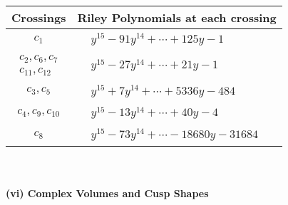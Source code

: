 \documentclass[1p]{elsarticle_modified}
\theoremstyle{definition}
\begin{document}
\begin{tabular}{m{50pt}|m{274pt}}
Crossings & \hspace{64pt}Riley Polynomials at each crossing \\
\hline $$\begin{aligned}c_{1}\end{aligned}$$&$\begin{aligned}
&y^{15}-91 y^{14}+\cdots+125 y-1
\end{aligned}$\\
\hline $$\begin{aligned}c_{2},c_{6},c_{7}\\c_{11},c_{12}\end{aligned}$$&$\begin{aligned}
&y^{15}-27 y^{14}+\cdots+21 y-1
\end{aligned}$\\
\hline $$\begin{aligned}c_{3},c_{5}\end{aligned}$$&$\begin{aligned}
&y^{15}+7 y^{14}+\cdots+5336 y-484
\end{aligned}$\\
\hline $$\begin{aligned}c_{4},c_{9},c_{10}\end{aligned}$$&$\begin{aligned}
&y^{15}-13 y^{14}+\cdots+40 y-4
\end{aligned}$\\
\hline $$\begin{aligned}c_{8}\end{aligned}$$&$\begin{aligned}
&y^{15}-73 y^{14}+\cdots-18680 y-31684
\end{aligned}$\\
\hline
\end{tabular}\\~\\
\newpage\flushleft \textbf{(vi) Complex Volumes and Cusp Shapes}
\end{document}
